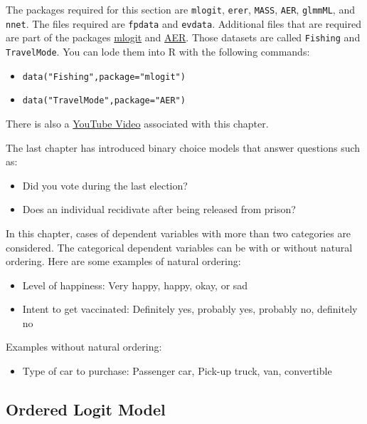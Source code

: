 \documentclass[
]{article}
\providecommand{\tightlist}{%
  \setlength{\itemsep}{0pt}\setlength{\parskip}{0pt}}
\begin{document}
The packages required for this section are \texttt{mlogit}, \texttt{erer}, \texttt{MASS}, \texttt{AER}, \texttt{glmmML}, and \texttt{nnet}. The files required are \texttt{fpdata} and \texttt{evdata}. Additional files that are required are part of the packages \href{https://cran.r-project.org/web/packages/mlogit/index.html}{mlogit} and \href{https://cran.r-project.org/web/packages/AER/index.html}{AER}. Those datasets are called \texttt{Fishing} and \texttt{TravelMode}. You can lode them into R with the following commands:

\begin{itemize}
\tightlist
\item
  \texttt{data("Fishing",package="mlogit")}
\item
  \texttt{data("TravelMode",package="AER")}
\end{itemize}

There is also a \href{https://youtu.be/xLUIil1sGW4}{YouTube Video} associated with this chapter.

The last chapter has introduced binary choice models that answer questions such as:

\begin{itemize}
\tightlist
\item
  Did you vote during the last election?
\item
  Does an individual recidivate after being released from prison?
\end{itemize}

In this chapter, cases of dependent variables with more than two categories are considered. The categorical dependent variables can be with or without natural ordering. Here are some examples of natural ordering:

\begin{itemize}
\tightlist
\item
  Level of happiness: Very happy, happy, okay, or sad
\item
  Intent to get vaccinated: Definitely yes, probably yes, probably no, definitely no
\end{itemize}

Examples without natural ordering:

\begin{itemize}
\tightlist
\item
  Type of car to purchase: Passenger car, Pick-up truck, van, convertible
\end{itemize}

\hypertarget{ordered-logit-model}{%
\subsection{Ordered Logit Model}\label{ordered-logit-model}}
\end{document}

